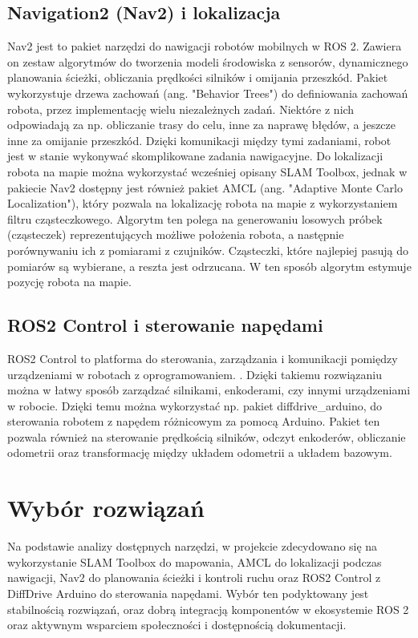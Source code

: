 \documentclass[a4paper,twoside,12pt]{book}
\begin{document}
\subsection{Navigation2 (Nav2) i lokalizacja}
Nav2 jest to pakiet narzędzi do nawigacji robotów mobilnych w ROS 2. Zawiera on zestaw algorytmów do tworzenia modeli środowiska z sensorów, dynamicznego planowania ścieżki, obliczania prędkości silników i omijania przeszkód. 
Pakiet wykorzystuje drzewa zachowań (ang. "Behavior Trees") do definiowania zachowań robota, przez implementację wielu niezależnych zadań. Niektóre z nich odpowiadają za np. obliczanie trasy do celu, inne za naprawę błędów, a jeszcze inne za omijanie przeszkód. Dzięki komunikacji między tymi zadaniami, robot jest w stanie wykonywać skomplikowane zadania nawigacyjne.
\cite{bib:abs-2003-00368}
\newline
\newline
Do lokalizacji robota na mapie można wykorzystać wcześniej opisany SLAM Toolbox, jednak w pakiecie Nav2 dostępny jest również pakiet AMCL (ang. "Adaptive Monte Carlo Localization")\cite{}, który pozwala na lokalizację robota na mapie z wykorzystaniem filtru cząsteczkowego. Algorytm ten polega na generowaniu losowych próbek (cząsteczek) reprezentujących możliwe położenia robota, a następnie porównywaniu ich z pomiarami z czujników. Cząsteczki, które najlepiej pasują do pomiarów są wybierane, a reszta jest odrzucana. W ten sposób algorytm estymuje pozycję robota na mapie. \cite{bib:amcl}
\subsection{ROS2 Control i sterowanie napędami}
ROS2 Control to platforma do sterowania, zarządzania i komunikacji pomiędzy urządzeniami w robotach z oprogramowaniem. \cite{bib:ros2control}. Dzięki takiemu rozwiązaniu można w łatwy sposób zarządzać silnikami, enkoderami, czy innymi urządzeniami w robocie. Dzięki temu można wykorzystać np. pakiet diffdrive\_arduino, do sterowania robotem z napędem różnicowym za pomocą Arduino. Pakiet ten pozwala również na sterowanie prędkością silników, odczyt enkoderów, obliczanie odometrii oraz transformację między układem odometrii a układem bazowym. \cite{bib:diffdrive}
 

\section{Wybór rozwiązań}
Na podstawie analizy dostępnych narzędzi, w projekcie zdecydowano się na wykorzystanie SLAM Toolbox do mapowania, AMCL do lokalizacji podczas nawigacji, Nav2 do planowania ścieżki i kontroli ruchu oraz ROS2 Control z DiffDrive Arduino do sterowania napędami. Wybór ten podyktowany jest stabilnością rozwiązań, oraz dobrą integracją komponentów w ekosystemie ROS 2 oraz aktywnym wsparciem społeczności i dostępnością dokumentacji.
\end{document}
